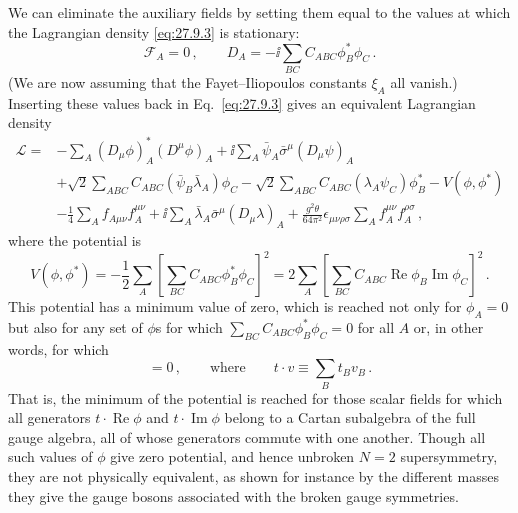 We can eliminate the auxiliary fields by setting them equal to the values at
which the Lagrangian density \eqref{eq:27.9.3} is stationary:
\begin{equation}
  \mathcal{F}_A=0\,,
  \qquad
  D_A=-\ii\sum_{BC}C_{ABC}\phi_B^*\phi_C\,.
  \tag{27.9.8}\label{eq:27.9.8}
\end{equation}
(We are now assuming that the Fayet--Iliopoulos constants \(\xi_A\) all
vanish.) Inserting these values back in Eq.~\eqref{eq:27.9.3} gives an
equivalent Lagrangian density
\begin{equation}
  \begin{aligned}
  \mathcal{L}={}&
  -\sum_A(D_\mu\phi)_A^*(D^\mu\phi)_A
  +\ii\sum_A\bar\psi_A\bar\sigma^\mu(D_\mu\psi)_A
  \\
  &+\sqrt{2}\sum_{ABC}C_{ABC}
    \left(\bar\psi_B\bar\lambda_A\right)\phi_C
  -\sqrt{2}\sum_{ABC}C_{ABC}
    \left(\lambda_A\psi_C\right)\phi_B^*
  -V(\phi,\phi^*)
  \\
  &-\frac14\sum_Af_{A\mu\nu}f_A^{\mu\nu}
  +\ii\sum_A\bar\lambda_A\bar\sigma^\mu(D_\mu\lambda)_A
  +\frac{g^2\theta}{64\pi^2}\epsilon_{\mu\nu\rho\sigma}
    \sum_Af_A^{\mu\nu}f_A^{\rho\sigma}\,,
  \end{aligned}
  \tag{27.9.9}\label{eq:27.9.9}
\end{equation}
where the potential is
\begin{equation}
  V(\phi,\phi^*)
  =-\frac12\sum_A\left[\sum_{BC}C_{ABC}\phi_B^*\phi_C\right]^2
  =2\sum_A\left[\sum_{BC}C_{ABC}\operatorname{Re}\phi_B
    \operatorname{Im}\phi_C\right]^2\,.
  \tag{27.9.10}\label{eq:27.9.10}
\end{equation}
This potential has a minimum value of zero, which is reached not only for
\(\phi_A=0\) but also for any set of \(\phi\)s for which
\(\sum_{BC}C_{ABC}\phi_B^*\phi_C=0\) for all \(A\) or, in other words, for
which
\begin{equation}
  [t\mathbin{\cdot}\operatorname{Re}\phi,
   t\mathbin{\cdot}\operatorname{Im}\phi]=0\,,
  \qquad
  \text{where}\qquad
  t\mathbin{\cdot}v\equiv\sum_Bt_Bv_B\,.
  \tag{27.9.11}\label{eq:27.9.11}
\end{equation}
That is, the minimum of the potential is reached for those scalar fields for
which all generators \(t\mathbin{\cdot}\operatorname{Re}\phi\) and
\(t\mathbin{\cdot}\operatorname{Im}\phi\) belong to a Cartan subalgebra of
the full gauge algebra, all of whose generators commute with one another.
Though all such values of \(\phi\) give zero potential, and hence unbroken
\(N=2\) supersymmetry, they are not physically equivalent, as shown for
instance by the different masses they give the gauge bosons associated with
the broken gauge symmetries.

